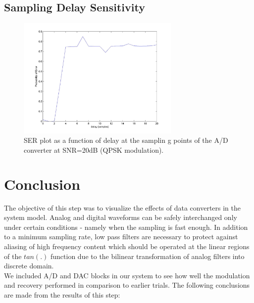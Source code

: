 \documentclass[]{article}
\begin{document}
\subsection{Sampling Delay Sensitivity}
\begin{figure}[H]
\centering
\hspace*{-2cm}\includegraphics[width=0.7\textwidth]{delaySensitivity.jpg}
\caption{SER plot as a function of delay at the samplin g points of the A/D converter at SNR=20dB (QPSK modulation). \label{fig:delay}}
\end{figure}

\newpage
\section{Conclusion}
\label{sec:conc}

The objective of this step was to visualize the effects of data converters in the system model.  Analog and digital waveforms can be safely interchanged only under certain conditions - namely when the sampling is fast enough.  In addition to a minimum sampling rate, low pass filters are necessary to protect against aliasing of high frequency content which should be operated at the linear regions of the $tan(.) $ function due to the bilinear transformation of analog filters into discrete domain.  \\

We included A/D and DAC blocks in our system to see how well the modulation and recovery performed in comparison to earlier trials. The following conclusions are made from the results of this step:
\end{document}
